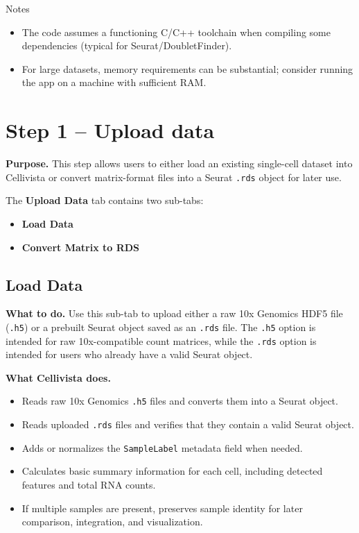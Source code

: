 \documentclass[11pt]{article}
\begin{document}
Notes

\begin{itemize}[leftmargin=*,nosep]
\item The code assumes a functioning C/C++ toolchain when compiling some dependencies (typical for Seurat/DoubletFinder).
\item For large datasets, memory requirements can be substantial; consider running the app on a machine with sufficient RAM.
\end{itemize}

\section{Step 1 -- Upload data}

\textbf{Purpose.}
This step allows users to either load an existing single-cell dataset into Cellivista or convert matrix-format files into a Seurat \texttt{.rds} object for later use.

The \textbf{Upload Data} tab contains two sub-tabs:
\begin{itemize}
  \item \textbf{Load Data}
  \item \textbf{Convert Matrix to RDS}
\end{itemize}

\subsection*{Load Data}

\textbf{What to do.}
Use this sub-tab to upload either a raw 10x Genomics HDF5 file (\texttt{.h5}) or a prebuilt Seurat object saved as an \texttt{.rds} file. The \texttt{.h5} option is intended for raw 10x-compatible count matrices, while the \texttt{.rds} option is intended for users who already have a valid Seurat object.

\textbf{What Cellivista does.}
\begin{itemize}
  \item Reads raw 10x Genomics \texttt{.h5} files and converts them into a Seurat object.
  \item Reads uploaded \texttt{.rds} files and verifies that they contain a valid Seurat object.
  \item Adds or normalizes the \texttt{SampleLabel} metadata field when needed.
  \item Calculates basic summary information for each cell, including detected features and total RNA counts.
  \item If multiple samples are present, preserves sample identity for later comparison, integration, and visualization.
\end{itemize}
\end{document}
